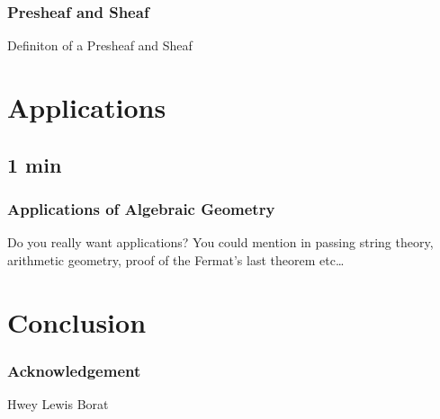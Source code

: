 \documentclass[pdf]{beamer}
\begin{document}
\begin{frame}
    \frametitle{Presheaf and Sheaf}
     Definiton of a Presheaf and Sheaf 
 \end{frame}

 \section{Applications}
 \subsection{1 min}

 \begin{frame}
     \frametitle{Applications of Algebraic Geometry}
    Do you really want applications? You could mention in passing string theory, arithmetic geometry, proof of the Fermat’s last theorem etc… 
\end{frame}

\section{Conclusion}

\begin{frame}
    \frametitle{Acknowledgement}
    Hwey Lewis
    Borat
\end{frame}
     
\end{document}
